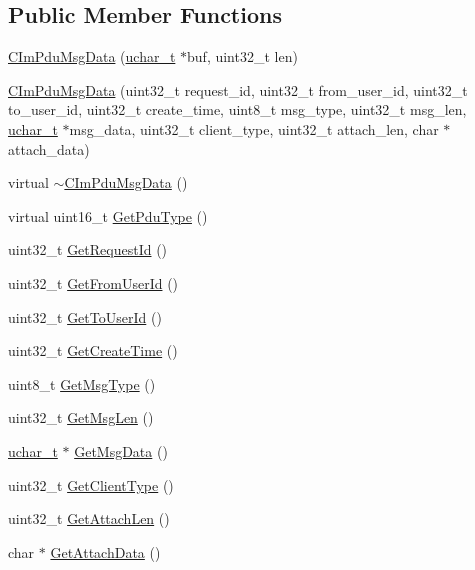 \subsection*{Public Member Functions}
\begin{DoxyCompactItemize}
\item 
\hyperlink{class_c_im_pdu_msg_data_ac2d2f2961b4322ee578b2e755c8687b4}{C\+Im\+Pdu\+Msg\+Data} (\hyperlink{base_2ostype_8h_a124ea0f8f4a23a0a286b5582137f0b8d}{uchar\+\_\+t} $\ast$buf, uint32\+\_\+t len)
\item 
\hyperlink{class_c_im_pdu_msg_data_a06c3598e7979131105253496c6c25241}{C\+Im\+Pdu\+Msg\+Data} (uint32\+\_\+t request\+\_\+id, uint32\+\_\+t from\+\_\+user\+\_\+id, uint32\+\_\+t to\+\_\+user\+\_\+id, uint32\+\_\+t create\+\_\+time, uint8\+\_\+t msg\+\_\+type, uint32\+\_\+t msg\+\_\+len, \hyperlink{base_2ostype_8h_a124ea0f8f4a23a0a286b5582137f0b8d}{uchar\+\_\+t} $\ast$msg\+\_\+data, uint32\+\_\+t client\+\_\+type, uint32\+\_\+t attach\+\_\+len, char $\ast$attach\+\_\+data)
\item 
virtual \hyperlink{class_c_im_pdu_msg_data_a93835ff1c92cddb3dc7948123a0a6e65}{$\sim$\+C\+Im\+Pdu\+Msg\+Data} ()
\item 
virtual uint16\+\_\+t \hyperlink{class_c_im_pdu_msg_data_ae62339b23b5fe70a094a7d3ce02927ef}{Get\+Pdu\+Type} ()
\item 
uint32\+\_\+t \hyperlink{class_c_im_pdu_msg_data_a3f5c810f4c0b00b40ffe35b1b19e1257}{Get\+Request\+Id} ()
\item 
uint32\+\_\+t \hyperlink{class_c_im_pdu_msg_data_aeb4af256163877b539ccb582387777aa}{Get\+From\+User\+Id} ()
\item 
uint32\+\_\+t \hyperlink{class_c_im_pdu_msg_data_af9b5c4abdb82d1e45bf03e6223ccd001}{Get\+To\+User\+Id} ()
\item 
uint32\+\_\+t \hyperlink{class_c_im_pdu_msg_data_a7b9fbb9683932e3d1a26a3970a680830}{Get\+Create\+Time} ()
\item 
uint8\+\_\+t \hyperlink{class_c_im_pdu_msg_data_a08d9796961da7ebb9db7eaef5f8586f1}{Get\+Msg\+Type} ()
\item 
uint32\+\_\+t \hyperlink{class_c_im_pdu_msg_data_ac57f081983933e87594caaad523a04ad}{Get\+Msg\+Len} ()
\item 
\hyperlink{base_2ostype_8h_a124ea0f8f4a23a0a286b5582137f0b8d}{uchar\+\_\+t} $\ast$ \hyperlink{class_c_im_pdu_msg_data_a29b6863177581eb218ab32179912be7e}{Get\+Msg\+Data} ()
\item 
uint32\+\_\+t \hyperlink{class_c_im_pdu_msg_data_ae72ab7df876b265b3eaa7ffa38f105a3}{Get\+Client\+Type} ()
\item 
uint32\+\_\+t \hyperlink{class_c_im_pdu_msg_data_a8a9fb92075be4bf1c54e5a692a34e117}{Get\+Attach\+Len} ()
\item 
char $\ast$ \hyperlink{class_c_im_pdu_msg_data_ab57f26f2a9ed27fc9db3e581218d1b32}{Get\+Attach\+Data} ()
\end{DoxyCompactItemize}
